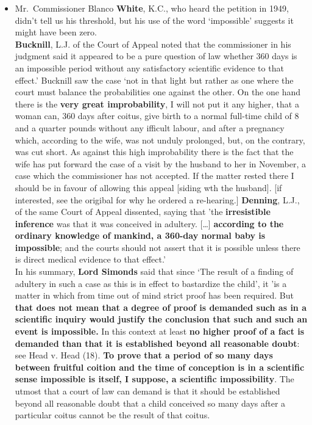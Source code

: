 \documentclass[]{book}
\providecommand{\tightlist}{%
  \setlength{\itemsep}{0pt}\setlength{\parskip}{0pt}}
\begin{document}
\begin{enumerate}
  \begin{itemize}
  \tightlist
  \item
    Mr.~Commissioner Blanco \textbf{White}, K.C., who heard the petition in 1949, didn't tell us his threshold, but his use of the word `impossible' suggests it might have been zero.\\
    \textbf{Bucknill}, L.J. of the Court of Appeal noted that the commissioner in his judgment said it appeared to be a pure question of law whether 360 days is an impossible period without any satisfactory scientific evidence to that effect.' Bucknill saw the case `not in that light but rather as one where the court must balance the probabilities one against the other. On the one hand there is the \textbf{very great improbability}, I will not put it any higher, that a woman can, 360 days after coitus, give birth to a normal full-time child of 8 and a quarter pounds without any ifficult labour, and after a pregnancy which, according to the wife, was not unduly prolonged, but, on the contrary, was cut short. As against this high improbability there is the fact that the wife has put forward the case of a visit by the husband to her in November, a case which the commissioner has not
    accepted. If the matter rested there I should be in favour of allowing this appeal {[}siding wth the husband{]}. {[}if interested, see the origibal for why he ordered a re-hearing.{]}
    \textbf{Denning}, L.J., of the same Court of Appeal dissented, saying that 'the \textbf{irresistible inference} was that it was conceived in adultery. {[}\ldots{}{]} \textbf{according to the ordinary knowledge of mankind, a 360-day normal baby is impossible}; and the courts should not assert that it is possible unless there is direct medical evidence to that effect.'\\
    In his summary, \textbf{Lord Simonds} said that since `The result of a finding of adultery in such a case as this is in effect to bastardize the child', it 'is a matter in which from time out of mind strict proof has been required. But \textbf{that does not mean that a degree of proof is demanded such as in a scientific inquiry would justify the conclusion that such and such an event is impossible.}
    In this context at least \textbf{no higher proof of a fact is demanded than that it is established beyond all reasonable doubt}: see Head v. Head (18). \textbf{To prove that a period of so many days between fruitful coition and the time of conception is in a scientific sense impossible is itself, I suppose, a scientific impossibility}. The utmost that a court of law can demand is that it should be established beyond all reasonable doubt that a child conceived so many days after a particular coitus cannot be the result of that coitus.
  \end{itemize}
\end{enumerate}
\end{document}
